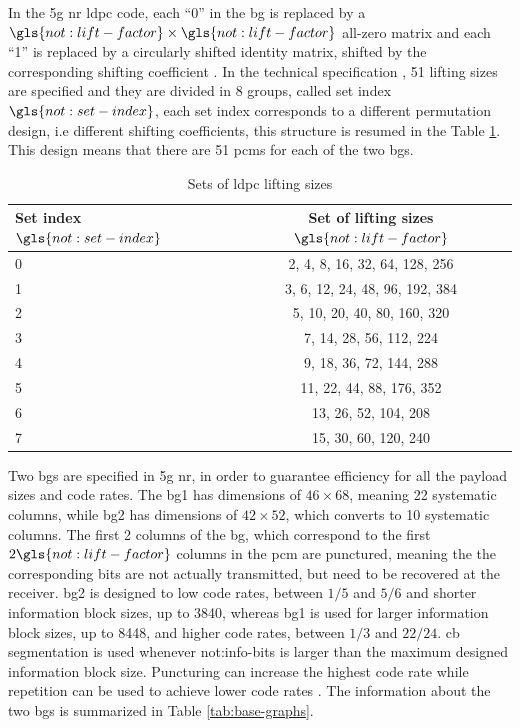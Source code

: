 In the \gls{5g} \gls{nr} \gls{ldpc} code, each ``0'' in the \gls{bg} is replaced by a $\gls{not:lift-factor} \times \gls{not:lift-factor} $ all-zero matrix and each ``1'' is replaced by a circularly shifted identity matrix, shifted by the corresponding shifting coefficient \cite{ErikDahlman5G}.
%
In the technical specification \cite{3gpp.38.212}, 51 lifting sizes are specified and they are divided in 8 groups, called set index $\gls{not:set-index}$, each set index corresponds to a different permutation design, i.e different shifting coefficients, this structure is resumed in the Table \ref{tab:lift-table}.
%
This design means that there are 51 \glspl{pcm} for each of the two \glspl{bg}.

\begin{table}[htb]
\centering
\caption{Sets of \gls{ldpc} lifting sizes}
\label{tab:lift-table}
\begin{tabular}{l c}
  \toprule
  Set index $\gls{not:set-index}$   & Set of lifting sizes $\gls{not:lift-factor}$ \\
  \midrule
  0  &  2, 4, 8, 16, 32, 64, 128, 256 \\
  1  &  3, 6, 12, 24, 48, 96, 192, 384 \\
  2  &  5, 10, 20, 40, 80, 160, 320 \\
  3  &  7, 14, 28, 56, 112, 224 \\
  4  &  9, 18, 36, 72, 144, 288 \\
  5  &  11, 22, 44, 88, 176, 352 \\
  6  &  13, 26, 52, 104, 208 \\
  7  &  15, 30, 60, 120, 240 \\
  \bottomrule
\end{tabular}
\end{table}


Two \glspl{bg} are specified in \gls{5g} \gls{nr}, in order to guarantee efficiency for all the payload sizes and code rates.
%
The \gls{bg}1 has dimensions of $46 \times 68$, meaning 22 systematic columns, while \gls{bg}2 has dimensions of $42 \times 52$, which converts to 10 systematic columns.
%
The first 2 columns of the \gls{bg}, which correspond to the first $2 \gls{not:lift-factor}$ columns in the \gls{pcm} are punctured, meaning the the corresponding bits are not actually transmitted, but need to be recovered at the receiver.
%
\Gls{bg}2 is designed to low code rates, between $1/5$ and $5/6$ and shorter information block sizes, up to 3840, whereas \gls{bg}1 is used for larger information block sizes, up to 8448, and higher code rates, between $1/3$ and $22/24$.
%
\Gls{cb} segmentation is used whenever \gls{not:info-bits} is larger than the maximum designed information block size.
%
Puncturing can increase the highest code rate while repetition can be used to achieve lower code rates \cite{ErikDahlman5G,AliZaidi632018,Hui2018}.
%
The information about the two \glspl{bg} is summarized in Table \ref{tab:base-graphs}.

